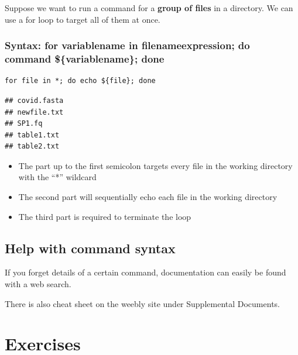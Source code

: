 \documentclass[
]{book}
\providecommand{\tightlist}{%
  \setlength{\itemsep}{0pt}\setlength{\parskip}{0pt}}
\begin{document}
Suppose we want to run a command for a \textbf{group of files} in a directory. We can use a for loop to target all of them at once.

\hypertarget{syntax-for-variablename-in-filenameexpression-do-command-variablename-done}{%
\subsubsection*{Syntax: for variablename in filenameexpression; do command \$\{variablename\}; done}\label{syntax-for-variablename-in-filenameexpression-do-command-variablename-done}}

\begin{verbatim}
for file in *; do echo ${file}; done
\end{verbatim}

\begin{verbatim}
## covid.fasta
## newfile.txt
## SP1.fq
## table1.txt
## table2.txt
\end{verbatim}

\begin{itemize}
\tightlist
\item
  The part up to the first semicolon targets every file in the working directory with the ``*'' wildcard
\item
  The second part will sequentially echo each file in the working directory
\item
  The third part is required to terminate the loop
\end{itemize}

\hypertarget{help-with-command-syntax}{%
\subsection{Help with command syntax}\label{help-with-command-syntax}}

If you forget details of a certain command, documentation can easily be found with a web search.

There is also cheat sheet on the weebly site under Supplemental Documents.

\hypertarget{exercises}{%
\section{Exercises}\label{exercises}}
\end{document}
